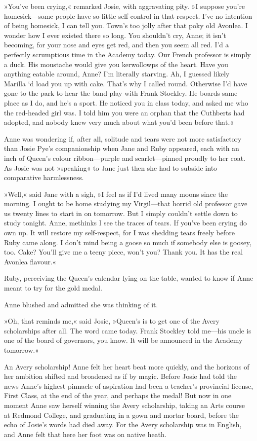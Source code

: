 »You’ve been crying,« remarked Josie, with aggravating pity. »I suppose you’re homesick—some people have so little self-control in that respect. I’ve no intention of being homesick, I can tell you. Town’s too jolly after that poky old Avonlea. I wonder how I ever existed there so long. You shouldn’t cry, Anne; it isn’t becoming, for your nose and eyes get red, and then you seem all red. I’d a perfectly scrumptious time in the Academy today. Our French professor is simply a duck. His moustache would give you kerwollowps of the heart. Have you anything eatable around, Anne? I’m literally starving. Ah, I guessed likely Marilla `d load you up with cake. That's why I called round. Otherwise I’d have gone to the park to hear the band play with Frank Stockley. He boards same place as I do, and he’s a sport. He noticed you in class today, and asked me who the red-headed girl was. I told him you were an orphan that the Cuthberts had adopted, and nobody knew very much about what you’d been before that.«

Anne was wondering if, after all, solitude and tears were not more satisfactory than Josie Pye’s companionship when Jane and Ruby appeared, each with an inch of Queen’s colour ribbon—purple and scarlet—pinned proudly to her coat. As Josie was not »speaking« to Jane just then she had to subside into comparative harmlessness.

»Well,« said Jane with a sigh, »I feel as if I’d lived many moons since the morning. I ought to be home studying my Virgil—that horrid old professor gave us twenty lines to start in on tomorrow. But I simply couldn’t settle down to study tonight. Anne, methinks I see the traces of tears. If you’ve been crying do own up. It will restore my self-respect, for I was shedding tears freely before Ruby came along. I don’t mind being a goose so much if somebody else is goosey, too. Cake? You’ll give me a teeny piece, won’t you? Thank you. It has the real Avonlea flavour.«

Ruby, perceiving the Queen’s calendar lying on the table, wanted to know if Anne meant to try for the gold medal.

Anne blushed and admitted she was thinking of it.

»Oh, that reminds me,« said Josie, »Queen’s is to get one of the Avery scholarships after all. The word came today. Frank Stockley told me—his uncle is one of the board of governors, you know. It will be announced in the Academy tomorrow.«

An Avery scholarship! Anne felt her heart beat more quickly, and the horizons of her ambition shifted and broadened as if by magic. Before Josie had told the news Anne’s highest pinnacle of aspiration had been a teacher’s provincial license, First Class, at the end of the year, and perhaps the medal! But now in one moment Anne saw herself winning the Avery scholarship, taking an Arts course at Redmond College, and graduating in a gown and mortar board, before the echo of Josie’s words had died away. For the Avery scholarship was in English, and Anne felt that here her foot was on native heath.

